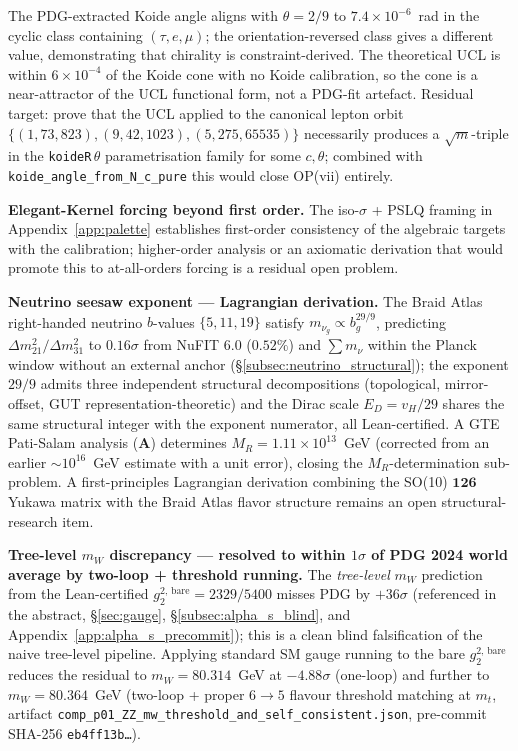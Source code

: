 \documentclass[11pt]{article}
\theoremstyle{remark}
\newcommand{\CatA}{\textbf{A}}
\begin{document}
{\begin{description}[leftmargin=2em,labelindent=0.5em,itemsep=0.28em]
  The PDG-extracted Koide angle aligns with $\theta = 2/9$ to $7.4 \times 10^{-6}$~rad
  in the cyclic class containing $(\tau, e, \mu)$; the orientation-reversed class
  gives a different value, demonstrating that chirality is constraint-derived.
  The theoretical UCL is within $6 \times 10^{-4}$ of the Koide cone with no Koide
  calibration, so the cone is a near-attractor of the UCL functional form, not a
  PDG-fit artefact.  Residual target: prove that the UCL applied to the canonical
  lepton orbit $\{(1,73,823), (9,42,1023), (5,275,65535)\}$ necessarily produces a
  $\sqrt{m}$-triple in the \texttt{koideR}\,$\theta$ parametrisation family for
  some $c, \theta$; combined with \texttt{koide\_angle\_from\_N\_c\_pure} this would
  close OP(vii) entirely.
  \item[(vii$'$)] \textbf{Elegant-Kernel forcing beyond first order.} The iso-$\sigma$ + PSLQ framing in Appendix~\ref{app:palette} establishes first-order consistency of the algebraic targets with the calibration; higher-order analysis or an axiomatic derivation that would promote this to at-all-orders forcing is a residual open problem.
  \item[(vii$''$)] \textbf{Neutrino seesaw exponent --- Lagrangian derivation.} The Braid Atlas right-handed neutrino $b$-values $\{5, 11, 19\}$ satisfy $m_{\nu_g} \propto b_g^{29/9}$, predicting $\Delta m^2_{21}/\Delta m^2_{31}$ to $0.16\sigma$ from NuFIT 6.0 ($0.52\%$) and $\sum m_\nu$ within the Planck window without an external anchor (\S\ref{subsec:neutrino_structural}); the exponent $29/9$ admits three independent structural decompositions (topological, mirror-offset, GUT representation-theoretic) and the Dirac scale $E_D = v_H/29$ shares the same structural integer with the exponent numerator, all Lean-certified.  A GTE Pati-Salam analysis (\CatA) determines $M_R = 1.11\times10^{13}$~GeV (corrected from an earlier ${\sim}10^{16}$~GeV estimate with a unit error), closing the $M_R$-determination sub-problem.  A first-principles Lagrangian derivation combining the SO(10) $\mathbf{126}$ Yukawa matrix with the Braid Atlas flavor structure remains an open structural-research item.
  \item[(viii)] \textbf{Tree-level $m_W$ discrepancy --- resolved to within $1\sigma$ of PDG 2024 world average by two-loop + threshold running.} The \emph{tree-level} $m_W$ prediction from the Lean-certified $g_2^{2,\,\mathrm{bare}} = 2329/5400$ misses PDG by $+36\sigma$ (referenced in the abstract, \S\ref{sec:gauge}, \S\ref{subsec:alpha_s_blind}, and Appendix~\ref{app:alpha_s_precommit}); this is a clean blind falsification of the naive tree-level pipeline.  Applying standard SM gauge running to the bare $g_2^{2,\,\mathrm{bare}}$ reduces the residual to $m_W = 80.314$~GeV at $-4.88\sigma$ (one-loop) and further to $m_W = 80.364$~GeV (two-loop + proper $6{\to}5$ flavour threshold matching at $m_t$, artifact \texttt{comp\_p01\_ZZ\_mw\_threshold\_\allowbreak and\_self\_consistent.json}, pre-commit SHA-256 \texttt{eb4ff13b\ldots}).


\end{description}}
\end{document}
